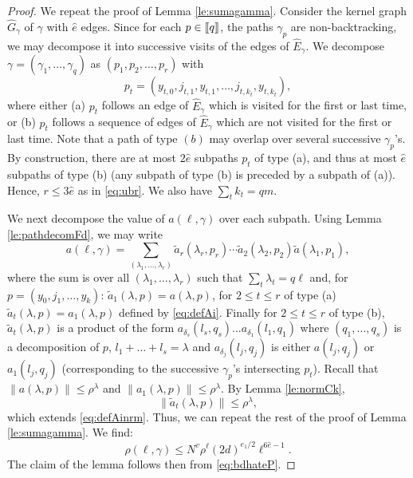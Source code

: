 \documentclass[11pt]{article}
\newcommand{\1}{1\!\!{\sf I}}
\newcommand{\INT}[1]{{{\left[\hspace{-1.4pt}\left[#1\right]\hspace{-1.4pt}\right]}}}
\begin{document}
\begin{proof}
We repeat the proof of Lemma \ref{le:sumagamma}. Consider the kernel graph $\widehat G_\gamma$ of $\gamma$ with $\hat e$ edges. Since for each $p \in \INT{q}$, the paths $\gamma_p$ are non-backtracking, we may decompose it into successive visits of the edges of $\widehat E_\gamma$.  We decompose $\gamma = (\gamma_1,\ldots,\gamma_q)$ as $ (p_{1}, p_{2}, \ldots , p_{r})$ with $$p_t =   (y_{t,0},j_{t,1},y_{t,1},\ldots, j_{t,k_t},y_{t,k_t}),$$  where either (a) $p_{t} $ 
follows an edge of $\widehat E_\gamma$ which is visited for the first or last time, or (b) $p_{t}$ follows a sequence  of edges of 
$\widehat E_\gamma$ which are not visited for the first or last time. Note that a path of type $(b)$ may overlap over several successive $\gamma_p$'s. By construction, there are at most $2\hat e$ subpaths $p_{t}$ of type (a), and thus at most $ \hat e$ subpaths of type (b) (any subpath of type (b) is preceded by a subpath of (a)). Hence, $r \leq 3 \hat e$ as in \eqref{eq:ubr}. We also have 
$
\sum_t k_t = q m.
$

We next decompose the value of $a(\ell,\gamma)$ over each subpath. Using Lemma \ref{le:pathdecomFd}, we may write 
\begin{equation}\label{eq:decompalgammaP}
a(\ell,\gamma) =  \sum_{(\lambda_1, \ldots ,\lambda_r) } \tilde a_{r}(\lambda_r,p_r) \cdots  \tilde a_{2}(\lambda_2,p_2) \tilde a(\lambda_1,p_1),
\end{equation}
where the sum is over all $(\lambda_1,\ldots,\lambda_r)$ such that $\sum_{t} \lambda_t = q \ell$ and, for $p = (y_0,j_1,\ldots,y_k)$: $\tilde a_1 (\lambda,p) = a(\lambda,p)$, for $2 \leq t \leq r$ of type (a)   $\tilde a_t(\lambda,p) = a_{1} (\lambda,p)$ defined by \eqref{eq:defAi}. Finally for $2  \leq t \leq r$ of type (b), $\tilde a_t(\lambda,p)$  is a product of the form $a_ {\delta_s} (l_s,q_s)\ldots a_{\delta_1} (l_1,q_1)$ where $(q_1,\ldots,q_s)$ is a decomposition of $p$, $l_1 + \ldots + l_s = \lambda$ and $a_{\delta_j}(l_j,q_j)$ is either $a(l_j,q_j)$ or $a_1(l_j,q_j)$ (corresponding to the successive $\gamma_p$'s intersecting $p_t$). 
Recall that $\| a(\lambda,p) \| \leq \rho^{\lambda}$ and $\| a_1(\lambda,p) \| \leq \rho^{\lambda}$. By Lemma \ref{le:normCk},
\begin{equation*}\label{eq:defAinrmP} 
\| \tilde a_t (\lambda,p) \| \leq  \rho^{\lambda},
\end{equation*} 
which extends \eqref{eq:defAinrm}. Thus, we can repeat the rest of the proof of Lemma \ref{le:sumagamma}. We find:
$$
\rho (\ell,\gamma) \leq N^v \rho^{\ell} (2d)^{e_1/2} \ell^{6 \hat e -1 }.
$$
The claim of the lemma follows then from \eqref{eq:bdhateP}.
\end{proof}
\end{document}
